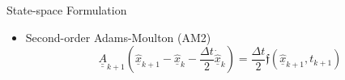 \documentclass[dvips,xcolor=cmyk]{beamer}
\newcommand{\tens}[1]{\underline{\underline{#1}}}
\renewcommand{\vec}[1]{\underline{#1}}
\begin{document}
\begin{frame}[shrink=10]{State-space Formulation}
\begin{itemize}
\begin{columns}[c]
    \column{2.0 in}
    \begin{equation*}
         \tens{A} (\hat{\vec{x}}(t)) &= \begin{bmatrix}
        \tens{D} & \tens{0} \\
        \tens{0} & \tens{M}
        \end{bmatrix}
    \end{equation*} 
    \begin{equation*}
    \mathfrak{f}(\hat{\vec{x}}(t),t) &=  \begin{Bmatrix}
    \int_0^l \tens{N}^T \vec{v}~dx_1 \\
    \vec{F}(\hat{\vec{x}}(t),t)
    \end{Bmatrix}
    \end{equation*}
    
    \end{columns}
    
    \item Second-order Adams-Moulton (AM2)
    \begin{equation*}
    \label{AM2-Govn}
    \tens{A}_{k+1} (\hat{\vec{x}}_{k+1}-\hat{\vec{x}}_{k} - \frac{\Delta t}{2} \vec{\dot{\hat{x}}}_k) =  \frac{\Delta t}{2} \mathfrak{f}(\hat{\vec{x}}_{k+1},t_{k+1})  
    \end{equation*}
      
\end{itemize}

\end{frame}
\end{document}
